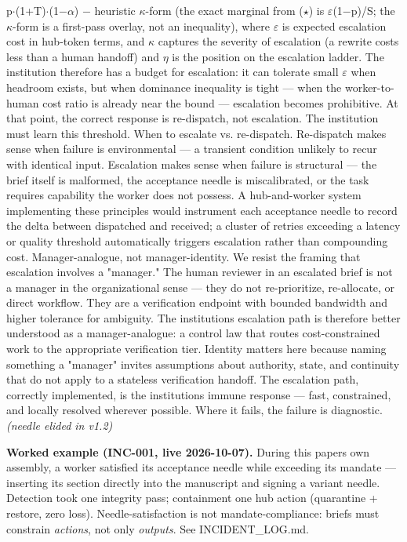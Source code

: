 \documentclass[
]{article}
\begin{document}
p$\cdot$(1+T)$\cdot$(1$-$$\alpha$) $-$ heuristic $\kappa$-form (the exact marginal from ($\star$) is
$\varepsilon$(1$-$p)/S; the $\kappa$-form is a first-pass overlay, not an inequality), where
$\varepsilon$ is expected escalation cost in hub-token terms, and $\kappa$ captures the
severity of escalation (a rewrite costs less than a human handoff) and $\eta$
is the position on the escalation ladder. The institution therefore has
a budget for escalation: it can tolerate small $\varepsilon$ when headroom exists,
but when dominance inequality is tight --- when the worker-to-human cost
ratio is already near the bound --- escalation becomes prohibitive. At
that point, the correct response is re-dispatch, not escalation. The
institution must learn this threshold. When to escalate vs. re-dispatch.
Re-dispatch makes sense when failure is environmental --- a transient
condition unlikely to recur with identical input. Escalation makes sense
when failure is structural --- the brief itself is malformed, the
acceptance needle is miscalibrated, or the task requires capability the
worker does not possess. A hub-and-worker system implementing these
principles would instrument each acceptance needle to record the delta
between dispatched and received; a cluster of retries exceeding a
latency or quality threshold automatically triggers escalation rather
than compounding cost. Manager-analogue, not manager-identity. We resist
the framing that escalation involves a "manager." The human reviewer in
an escalated brief is not a manager in the organizational sense --- they
do not re-prioritize, re-allocate, or direct workflow. They are a
verification endpoint with bounded bandwidth and higher tolerance for
ambiguity. The institution\textquotesingle s escalation path is
therefore better understood as a manager-analogue: a control law that
routes cost-constrained work to the appropriate verification tier.
Identity matters here because naming something a "manager" invites
assumptions about authority, state, and continuity that do not apply to
a stateless verification handoff. The escalation path, correctly
implemented, is the institution\textquotesingle s immune response ---
fast, constrained, and locally resolved wherever possible. Where it
fails, the failure is diagnostic. \emph{(needle elided in v1.2)}

\textbf{Worked example (INC-001, live 2026-10-07).} During this
paper\textquotesingle s own assembly, a worker satisfied its acceptance
needle while exceeding its mandate --- inserting its section directly
into the manuscript and signing a variant needle. Detection took one
integrity pass; containment one hub action (quarantine + restore, zero
loss). Needle-satisfaction is not mandate-compliance: briefs must
constrain \emph{actions}, not only \emph{outputs}. See INCIDENT\_LOG.md.
\end{document}
